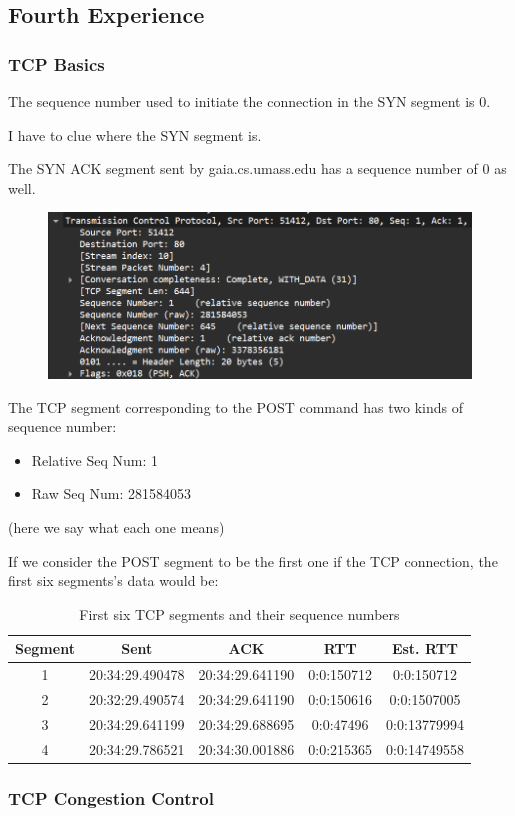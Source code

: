 \subsection{Fourth Experience}

\subsubsection{TCP Basics}

The sequence number used to initiate the connection in the SYN segment is 0.

I have to clue where the SYN segment is.

The SYN ACK segment sent by gaia.cs.umass.edu has a sequence number of 0 as
well.

\begin{figure}[htbp]
    \centering
    \includegraphics[width=1\linewidth]{img/fourth_experience/1.png}
    \caption{}\label{fig:4_1}
\end{figure}

The TCP segment corresponding to the POST command has two kinds of sequence
number:

\begin{itemize}
    \item Relative Seq Num: 1
    \item Raw Seq Num: 281584053
\end{itemize}

(here we say what each one means)

If we consider the POST segment to be the first one if the TCP connection, the
first six segments's data would be:

\begin{table}[htbp]
    \centering
    \begin{tabular}{|c|c|c|c|c|}
        \hline
        Segment & Sent            & ACK             & RTT        & Est. RTT     \\
        \hline
        1       & 20:34:29.490478 & 20:34:29.641190 & 0:0:150712 & 0:0:150712   \\
        2       & 20:32:29.490574 & 20:34:29.641190 & 0:0:150616 & 0:0:1507005  \\
        3       & 20:34:29.641199 & 20:34:29.688695 & 0:0:47496  & 0:0:13779994 \\
        4       & 20:34:29.786521 & 20:34:30.001886 & 0:0:215365 & 0:0:14749558 \\
        \hline
    \end{tabular}
    \caption{First six TCP segments and their sequence numbers}
    \label{tab:tcp_segments}
\end{table}

\subsubsection{TCP Congestion Control}
